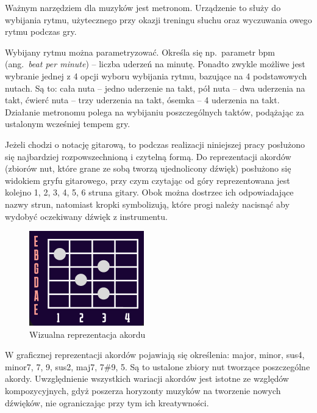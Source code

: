 Ważnym narzędziem dla muzyków jest metronom. Urządzenie to służy do wybijania rytmu, użytecznego przy okazji treningu słuchu oraz wyczuwania owego rytmu podczas gry. 

Wybijany rytmu można parametryzować. Określa się np.\ parametr bpm (ang.~\emph{beat per minute}) -- liczba uderzeń na minutę. Ponadto zwykle możliwe jest wybranie jednej z 4 opcji wyboru wybijania rytmu, bazujące na 4 podstawowych nutach. Są to: cała nuta -- jedno uderzenie na takt, pół nuta -- dwa uderzenia na takt, ćwierć nuta -- trzy uderzenia na takt, ósemka -- 4 uderzenia na takt. Działanie metronomu polega na wybijaniu poszczególnych taktów, podążając za ustalonym wcześniej tempem gry. 

Jeżeli chodzi o notację gitarową, to podczas realizacji niniejszej pracy posłużono się najbardziej rozpowszechnioną i czytelną formą. Do reprezentacji akordów (zbiorów nut, które grane ze sobą tworzą ujednolicony dźwięk) posłużono się widokiem gryfu gitarowego, przy czym czytając od góry reprezentowana jest kolejno 1, 2, 3, 4, 5, 6 struna gitary. Obok można dostrzec ich odpowiadające nazwy strun, natomiast kropki symbolizują, które progi należy nacisnąć aby wydobyć oczekiwany dźwięk z instrumentu.


\begin{figure}[htb]
	\centering
	\includegraphics[width=.4\linewidth]{rys02/akord2.2}
	\caption{Wizualna reprezentacja akordu} \label{fig:wizualizacjaAkordu}
\end{figure}

W graficznej reprezentacji akordów pojawiają się określenia: major, minor, sus4, minor7, 7, 9, sus2, maj7, 7\#9, 5. Są to ustalone zbiory nut tworzące poszczególne akordy. Uwzględnienie wszystkich wariacji akordów jest istotne ze względów kompozycyjnych, gdyż poszerza horyzonty muzyków na tworzenie nowych dźwięków, nie ograniczając przy tym ich kreatywności. 


